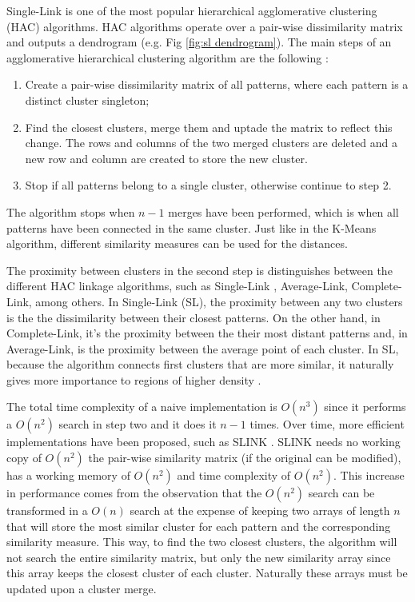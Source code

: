 Single-Link \cite{sneath1962numerical} is one of the most popular hierarchical agglomerative clustering (HAC) algorithms.
HAC algorithms operate over a pair-wise dissimilarity matrix and outputs a dendrogram (e.g. Fig \ref{fig:sl dendrogram}).
The main steps of an agglomerative hierarchical clustering algorithm are the following \cite{Jain1999}:
\begin{enumerate}
    \item Create a pair-wise dissimilarity matrix of all patterns, where each pattern is a distinct cluster singleton;

    \item Find the closest clusters, merge them and uptade the matrix to reflect this change. The rows and columns of the two merged clusters are deleted and a new row and column are created to store the new cluster.%

    \item Stop if all patterns belong to a single cluster, otherwise continue to step 2.
\end{enumerate}

The algorithm stops when $n-1$ merges have been performed, which is when all patterns have been connected in the same cluster.
Just like in the K-Means algorithm, different similarity measures can be used for the distances.

The proximity between clusters in the second step is distinguishes between the different HAC linkage algorithms, such as Single-Link , Average-Link, Complete-Link, among others.
In Single-Link (SL), the proximity between any two clusters is the the dissimilarity between their closest patterns.
On the other hand, in Complete-Link, it's the proximity between the their most distant patterns and, in Average-Link, is the proximity between the average point of each cluster.
In SL, because the algorithm connects first clusters that are more similar, it naturally gives more importance to regions of higher density \cite{Aggarwal2014}.

The total time complexity of a naive implementation is $O(n^3)$ since it performs a $O(n^2)$ search in step two and it does it $n-1$ times.
Over time, more efficient implementations have been proposed, such as SLINK \cite{Sibson1973}.
SLINK needs no working copy of $O(n^2)$ the pair-wise similarity matrix (if the original can be modified), has a working memory of $O(n^2)$ and time complexity of $O(n^2)$.
This increase in performance comes from the observation that the $O(n^2)$ search can be transformed in a $O(n)$ search at the expense of keeping two arrays of length $n$ that will store the most similar cluster for each pattern and the corresponding similarity measure.
This way, to find the two closest clusters, the algorithm will not search the entire similarity matrix, but only the new similarity array since this array keeps the closest cluster of each cluster.
Naturally these arrays must be updated upon a cluster merge.

